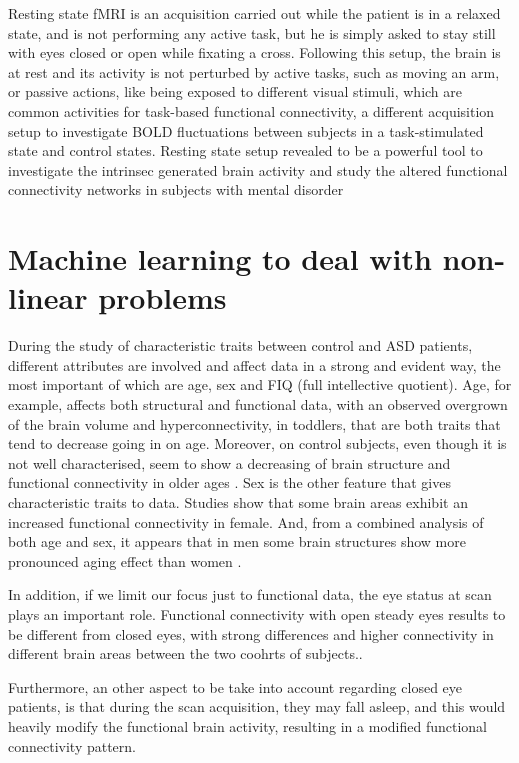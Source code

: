 \documentclass[11pt]{report}
\begin{document}
Resting state fMRI is an acquisition carried out while the patient is in a relaxed state, and is not performing any active task, but he is simply asked to stay still with eyes closed or open while fixating a cross.
Following this setup, the brain is at rest and its activity is not perturbed by active tasks, such as moving an arm, or passive actions, like being exposed to different visual stimuli, which are common activities for task-based functional connectivity, a different acquisition setup to investigate BOLD fluctuations between subjects in a task-stimulated state and control states.
Resting state setup revealed to be a powerful tool to investigate the intrinsec generated brain activity and study the altered functional connectivity networks in subjects with mental disorder

\section{Machine learning to deal with non-linear problems}\label{sec:intro_ml}
During the study of characteristic traits between control and ASD patients, different attributes are involved and affect data in a strong and evident way, the most important of which are age, sex and FIQ (full intellective quotient).
Age, for example, affects both structural and functional data, with an observed overgrown of the brain volume and hyperconnectivity, in toddlers, that are both traits that tend to decrease going in on age.
Moreover, on control subjects, even though it is not well characterised, seem to show a decreasing of brain structure and functional connectivity in older ages \cite{zhangC-2016}.
Sex is the other feature that gives characteristic traits to data.
Studies show that some brain areas exhibit an increased functional connectivity in female.
And, from a combined analysis of both age and sex, it appears that in men some brain structures show more pronounced aging effect than women \cite{coffey-1998}.

In addition, if we limit our focus just to functional data, the eye status at scan plays an important role.
Functional connectivity with open steady eyes results to be different from closed eyes, with strong differences and higher connectivity in different brain areas between the two coohrts of subjects.\cite{costumero-2020}.

Furthermore, an other aspect to be take into account regarding closed eye patients, is that during the scan acquisition, they may fall asleep, and this would heavily modify the functional brain activity, resulting in a modified functional connectivity pattern.
\end{document}
